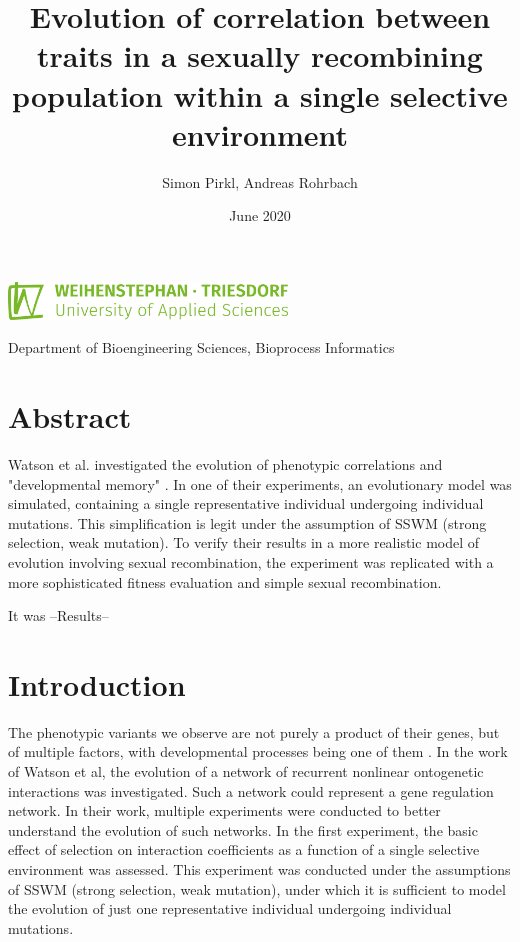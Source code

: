 \documentclass{article}
\title{Evolution of correlation between traits in a sexually recombining population within a single selective environment}
\date{June 2020}
\author{Simon Pirkl, Andreas Rohrbach}
\begin{document}
\maketitle

\begin{center}
	\includegraphics[height=10mm]{./img/ci/HSWT_Logo_gruen.png}

	\vspace{5mm}
	Department of Bioengineering Sciences, Bioprocess Informatics
\end{center}


\tableofcontents
\newpage

\section{Abstract}

Watson et al. investigated the evolution of phenotypic correlations and "developmental memory" \cite{watson2014}. In one of their experiments, an evolutionary model was simulated, containing a single representative individual undergoing individual mutations. This simplification is legit under the assumption of SSWM (strong selection, weak mutation). 
To verify their results in a more realistic model of evolution involving sexual recombination, the experiment was replicated with a more sophisticated fitness evaluation and simple sexual recombination.

It was --Results--

\section{Introduction}

The phenotypic variants we observe are not purely a product of their genes, but of multiple factors, with developmental processes being one of them \cite{laland2015}. In the work of Watson et al, the evolution of a network of recurrent nonlinear ontogenetic interactions was investigated. Such a network could represent a gene regulation network. In their work, multiple experiments were conducted to better understand the evolution of such networks. In the first experiment, the basic effect of selection on interaction coefficients as a function of a single selective environment was assessed. This experiment was conducted under the assumptions of SSWM (strong selection, weak mutation), under which it is sufficient to model the evolution of just one representative individual undergoing individual mutations. 
\end{document}
